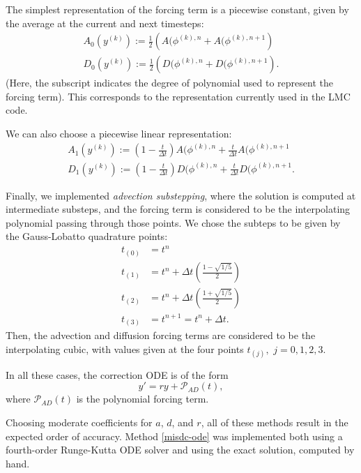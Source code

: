\documentclass[12pt]{article}
\begin{document}
The simplest representation of the forcing term is a piecewise constant, 
given by the average at the current and next timesteps:
\begin{gather}
    A_0(y^{(k)}) := \frac{1}{2} \left( A(\phi^{(k),n}
                                        + A(\phi^{(k),n+1} \right) \\
    D_0(y^{(k)}) := \frac{1}{2} \left( D(\phi^{(k),n}
                                        + D(\phi^{(k),n+1} \right).
\end{gather}
(Here, the subscript indicates the degree of polynomial used to represent the 
forcing term). This corresponds to the representation currently used in the LMC 
code.

We can also choose a piecewise linear representation:
\begin{gather}
    A_1(y^{(k)}) := \left(1 - \frac{t}{\Delta t}\right) A(\phi^{(k),n}
                            + \frac{t}{\Delta t}        A(\phi^{(k),n+1}\\
    D_1(y^{(k)}) := \left(1 - \frac{t}{\Delta t}\right) D(\phi^{(k),n}
                            + \frac{t}{\Delta t}        D(\phi^{(k),n+1}.
\end{gather}

Finally, we implemented \textit{advection substepping}, where the solution is 
computed at intermediate substeps, and the forcing term is considered to be 
the interpolating polynomial passing through those points. We chose the subteps 
to be given by the Gauss-Lobatto quadrature points:
\begin{align*}
    t_{(0)} &= t^n \\
    t_{(1)} &= t^n + \Delta t \left( \frac{1 - \sqrt{1/5}}{2} \right)\\
    t_{(2)} &= t^n + \Delta t \left( \frac{1 + \sqrt{1/5}}{2} \right)\\
    t_{(3)} &= t^{n+1} = t^n + \Delta t.
\end{align*}
Then, the advection and diffusion forcing terms are considered to be the 
interpolating cubic, with values given at the four points $t_{(j)},$
$j=0,1,2,3$.

In all these cases, the correction ODE is of the form
\begin{equation}
    y' = ry + \mathcal{P}_{AD}(t),
\end{equation}
where $\mathcal{P}_{AD}(t)$ is the polynomial forcing term.

Choosing moderate coefficients for $a$, $d$, and $r$, all of these methods 
result in the expected order of accuracy. Method \ref{misdc-ode} was implemented 
both using a fourth-order Runge-Kutta ODE solver and using the exact solution, 
computed by hand.
\end{document}
